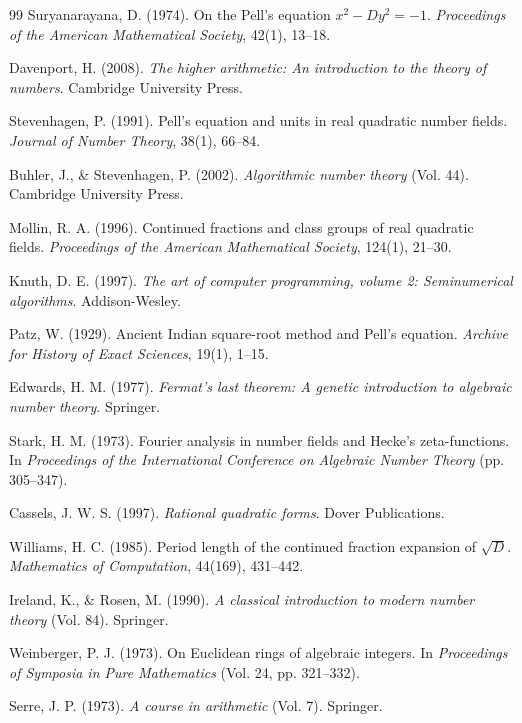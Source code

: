 \documentclass[12pt]{article}
\begin{document}
\begin{thebibliography}{99}
Suryanarayana, D. (1974). On the Pell's equation $x^2 - Dy^2 = -1$. \emph{Proceedings of the American Mathematical Society}, 42(1), 13--18.

Davenport, H. (2008). \emph{The higher arithmetic: An introduction to the theory of numbers}. Cambridge University Press.

Stevenhagen, P. (1991). Pell's equation and units in real quadratic number fields. \emph{Journal of Number Theory}, 38(1), 66--84.

Buhler, J., \& Stevenhagen, P. (2002). \emph{Algorithmic number theory} (Vol. 44). Cambridge University Press.

Mollin, R. A. (1996). Continued fractions and class groups of real quadratic fields. \emph{Proceedings of the American Mathematical Society}, 124(1), 21--30.

Knuth, D. E. (1997). \emph{The art of computer programming, volume 2: Seminumerical algorithms}. Addison-Wesley.

Patz, W. (1929). Ancient Indian square-root method and Pell's equation. \emph{Archive for History of Exact Sciences}, 19(1), 1--15.

Edwards, H. M. (1977). \emph{Fermat's last theorem: A genetic introduction to algebraic number theory}. Springer.

Stark, H. M. (1973). Fourier analysis in number fields and Hecke's zeta-functions. In \emph{Proceedings of the International Conference on Algebraic Number Theory} (pp. 305--347).

Cassels, J. W. S. (1997). \emph{Rational quadratic forms}. Dover Publications.

Williams, H. C. (1985). Period length of the continued fraction expansion of $\sqrt{D}$. \emph{Mathematics of Computation}, 44(169), 431--442.

Ireland, K., \& Rosen, M. (1990). \emph{A classical introduction to modern number theory} (Vol. 84). Springer.

Weinberger, P. J. (1973). On Euclidean rings of algebraic integers. In \emph{Proceedings of Symposia in Pure Mathematics} (Vol. 24, pp. 321--332).

Serre, J. P. (1973). \emph{A course in arithmetic} (Vol. 7). Springer.


\end{thebibliography}
\end{document}
